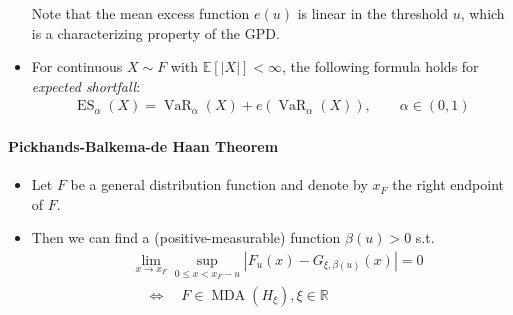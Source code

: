 \documentclass[a4paper,landscape,8pt,fleqn]{scrartcl}
\newcommand*\widefbox[1]{\fbox{\hspace{2em}#1\hspace{2em}}}		%
\DeclareMathOperator{\VaR}{VaR}				%
\DeclareMathOperator{\ES}{ES}					%
\DeclareMathOperator{\MDA}{MDA}			%
\begin{document}
\begin{multicols*}{3}
\begin{itemize}
Note that the mean excess function $e(u)$ is linear in the threshold $u$, which is a characterizing property of the GPD.
\item For continuous $X \sim F$ with $\mathbb{E}[|X|] < \infty$, the following formula holds for \textit{expected shortfall}:
\begin{align*}
\ES_\alpha(X) = \VaR_\alpha(X) + e(\VaR_\alpha(X)), \qquad \alpha \in (0,1)
\end{align*}
\end{itemize}

\paragraph{Pickhands-Balkema-de Haan Theorem}
\begin{itemize}
\item Let $F$ be a general distribution function and denote by $x_F$ the right endpoint of $F$.
\item Then we can find a (positive-measurable) function $\beta(u) > 0$ s.t.
\begin{align*}
&\lim_{x \to x_F} \sup_{0 \leq x < x_F-u} \left| F_u(x) - G_{\xi, \beta(u)}(x) \right| = 0 \\
&\quad \iff \quad F \in \MDA(H_\xi), \xi \in \mathbb{R}
\end{align*}
\end{itemize}


\end{multicols*}
\end{document}
